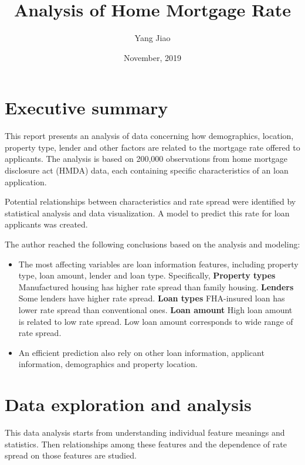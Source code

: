 \documentclass[a4paper,10pt,notitlepage]{article}
\begin{document}
\title{Analysis of Home Mortgage Rate}
\author{Yang Jiao}
\date{November, 2019}

\maketitle

\section{Executive summary}  %
This report presents an analysis of data concerning
how demographics, location, property type, lender and other factors are related to the mortgage rate offered to applicants.
The analysis is based on 200,000 observations from home mortgage disclosure act (HMDA) data, each containing specific characteristics of an loan application.

Potential relationships between characteristics and rate spread were identified by statistical analysis and data visualization. 
A model to predict this rate for loan applicants was created. 

The author reached the following conclusions based on the analysis and modeling:
\begin{itemize}
\item The most affecting variables are loan information features, including property type, loan amount, lender and loan type. Specifically, 
    \subitem \textbf{Property types} Manufactured housing has higher rate spread than family housing.
    \subitem \textbf{Lenders} Some lenders have higher rate spread.
    \subitem \textbf{Loan types} FHA-insured loan has lower rate spread than conventional ones.
    \subitem \textbf{Loan amount} High loan amount is related to low rate spread. Low loan amount corresponds to wide range of rate spread.
\item An efficient prediction also rely on other loan information, applicant information, demographics and property location.
\end{itemize}

\section{Data exploration and analysis}

This data analysis starts from understanding individual feature meanings and statistics. 
Then relationships among these features and the dependence of rate spread on those features are studied.
\end{document}
